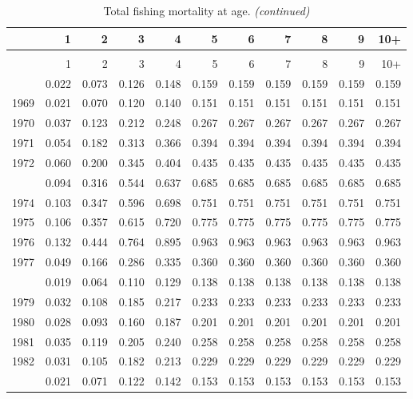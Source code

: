\documentclass[
]{article}
\begin{document}
\begin{longtable}[t]{lrrrrrrrrrr}
\caption{\label{tab:FAA-tot-table}Total fishing mortality at age.}\\
\toprule
  & 1 & 2 & 3 & 4 & 5 & 6 & 7 & 8 & 9 & 10+\\
\midrule
\endfirsthead
\caption[]{Total fishing mortality at age. \textit{(continued)}}\\
\toprule
  & 1 & 2 & 3 & 4 & 5 & 6 & 7 & 8 & 9 & 10+\\
\midrule
\endhead

\endfoot
\bottomrule
\endlastfoot
1968 & 0.022 & 0.073 & 0.126 & 0.148 & 0.159 & 0.159 & 0.159 & 0.159 & 0.159 & 0.159\\
1969 & 0.021 & 0.070 & 0.120 & 0.140 & 0.151 & 0.151 & 0.151 & 0.151 & 0.151 & 0.151\\
1970 & 0.037 & 0.123 & 0.212 & 0.248 & 0.267 & 0.267 & 0.267 & 0.267 & 0.267 & 0.267\\
1971 & 0.054 & 0.182 & 0.313 & 0.366 & 0.394 & 0.394 & 0.394 & 0.394 & 0.394 & 0.394\\
1972 & 0.060 & 0.200 & 0.345 & 0.404 & 0.435 & 0.435 & 0.435 & 0.435 & 0.435 & 0.435\\
\addlinespace
1973 & 0.094 & 0.316 & 0.544 & 0.637 & 0.685 & 0.685 & 0.685 & 0.685 & 0.685 & 0.685\\
1974 & 0.103 & 0.347 & 0.596 & 0.698 & 0.751 & 0.751 & 0.751 & 0.751 & 0.751 & 0.751\\
1975 & 0.106 & 0.357 & 0.615 & 0.720 & 0.775 & 0.775 & 0.775 & 0.775 & 0.775 & 0.775\\
1976 & 0.132 & 0.444 & 0.764 & 0.895 & 0.963 & 0.963 & 0.963 & 0.963 & 0.963 & 0.963\\
1977 & 0.049 & 0.166 & 0.286 & 0.335 & 0.360 & 0.360 & 0.360 & 0.360 & 0.360 & 0.360\\
\addlinespace
1978 & 0.019 & 0.064 & 0.110 & 0.129 & 0.138 & 0.138 & 0.138 & 0.138 & 0.138 & 0.138\\
1979 & 0.032 & 0.108 & 0.185 & 0.217 & 0.233 & 0.233 & 0.233 & 0.233 & 0.233 & 0.233\\
1980 & 0.028 & 0.093 & 0.160 & 0.187 & 0.201 & 0.201 & 0.201 & 0.201 & 0.201 & 0.201\\
1981 & 0.035 & 0.119 & 0.205 & 0.240 & 0.258 & 0.258 & 0.258 & 0.258 & 0.258 & 0.258\\
1982 & 0.031 & 0.105 & 0.182 & 0.213 & 0.229 & 0.229 & 0.229 & 0.229 & 0.229 & 0.229\\
\addlinespace
1983 & 0.021 & 0.071 & 0.122 & 0.142 & 0.153 & 0.153 & 0.153 & 0.153 & 0.153 & 0.153\\

\end{longtable}
\end{document}
